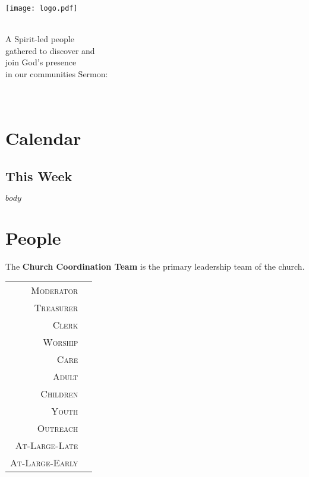 \documentclass[
notumble,
nofoldmark,
letterpaper,
10pt,
]{leaflet}
\date{\formatdate{#3}{#2}{#1}}%
\newcommand{\cct}[1]{
        \textsc{#1} & \textbf{\DTLfetch{cct}{Position}{#1}{Name}} \\}
\begin{document}
\begin{titlepage}
\centering
\vfill
{\centering
\texttt{[image: logo.pdf]}\par}
\vfill
\LARGE\sundaydate\\
\vfill
\large A Spirit-led people \\ gathered to discover and \\ join God's presence \\ in our communities
\vfill
\vfill
\large Sermon:\\
\LARGE\sermontitle\\
\LARGE\scripture\\

\vfill
\end{titlepage}

\thispagestyle{empty}

\section{\faCalendar \hspace{.5em} Calendar}

\subsection{This Week}


\vfill

\pagebreak


$body$


\vfill

\pagebreak

\section{\faGroup \hspace{.5em} People}


The \textbf{Church Coordination Team} is the primary leadership team of the church.

\begin{tabular}{rl}
\cct{Moderator}
\cct{Treasurer}
\cct{Clerk}
\cct{Worship}
\cct{Care}
\cct{Adult}
\cct{Children}
\cct{Youth}
\cct{Outreach}
\cct{At-Large-Late}
\cct{At-Large-Early}
\end{tabular}
\end{document}
